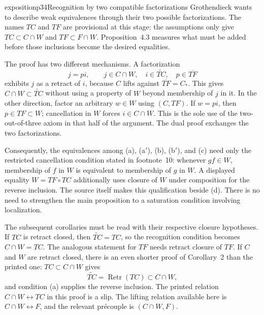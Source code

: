 \begin{dcomment}{exposition}{p34}{Recognition by two compatible factorizations}
Grothendieck wants to describe weak equivalences through their two possible factorizations. The names $TC$ and $TF$ are provisional at this stage: the assumptions only give $TC\subset C\cap W$ and $TF\subset F\cap W$. Proposition~4.3 measures what must be added before those inclusions become the desired equalities.

The proof has two different mechanisms. A factorization
\[
j=pi,\qquad j\in C\cap W,\quad
i\in\widetilde{TC},\quad p\in\overline{TF}
\]
exhibits $j$ as a retract of $i$, because $C$ lifts against $\overline{TF}=C_*$. This gives $C\cap W\subset\widetilde{TC}$ without using a property of $W$ beyond membership of $j$ in it. In the other direction, factor an arbitrary $w\in W$ using $(C,TF)$. If $w=pi$, then $p\in TF\subset W$; cancellation in $W$ forces $i\in C\cap W$. This is the sole use of the two-out-of-three axiom in that half of the argument. The dual proof exchanges the two factorizations.

Consequently, the equivalences among (a), (a$'$), (b), (b$'$), and (c) need only the restricted cancellation condition stated in footnote~10: whenever $gf\in W$, membership of $f$ in $W$ is equivalent to membership of $g$ in $W$. A displayed equality $W=TF\circ TC$ additionally uses closure of $W$ under composition for the reverse inclusion. The source itself makes this qualification beside (d). There is no need to strengthen the main proposition to a saturation condition involving localization.

The subsequent corollaries must be read with their respective closure hypotheses. If $TC$ is retract closed, then $\widetilde{TC}=TC$, so the recognition condition becomes $C\cap W=TC$. The analogous statement for $TF$ needs retract closure of $TF$. If $C$ and $W$ are retract closed, there is an even shorter proof of Corollary~2 than the printed one: $TC\subset C\cap W$ gives
\[
\widetilde{TC}=\operatorname{Retr}(TC)\subset C\cap W,
\]
and condition (a) supplies the reverse inclusion. The printed relation $C\cap W\longleftrightarrow TC$ in this proof is a slip. The lifting relation available here is $C\cap W\longleftrightarrow F$, and the relevant pr\'ecouple is $(C\cap W,F)$.
\end{dcomment}

